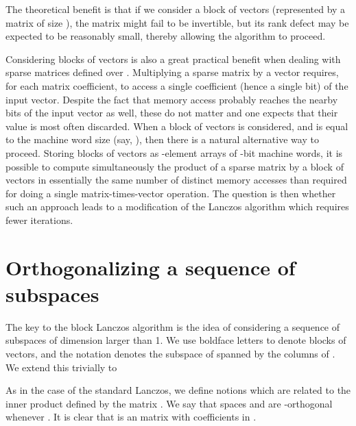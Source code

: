 The theoretical benefit is that if
we consider a block of  vectors  (represented by a
matrix of size ), the matrix  might
fail to be invertible, but its rank defect may be expected to be
reasonably small, thereby allowing the algorithm to proceed.

Considering blocks of vectors is also a great practical benefit when
dealing with sparse matrices defined over . Multiplying a sparse
matrix by a vector requires, for each matrix coefficient, to access a
single coefficient (hence a single bit) of the input vector. Despite the
fact that memory access probably reaches the nearby bits of the input
vector as well, these do not matter and one expects that their value is
most often discarded. When a block of  vectors is considered, and 
is equal to the machine word size (say, ), then there is a
natural alternative way to proceed. Storing blocks of vectors as
-element arrays of -bit machine words, it is possible to compute
simultaneously the product of a sparse matrix by a block of vectors in
essentially the same number of distinct memory accesses than required for
doing a single matrix-times-vector operation. The question is then
whether such an approach leads to a modification of the Lanczos algorithm
which requires fewer iterations.

\section{Orthogonalizing a sequence of subspaces}

The key to the block Lanczos algorithm is the idea of considering a
sequence of subspaces of dimension larger than 1. We use boldface letters
to denote blocks of  vectors, and the notation
 denotes the subspace of  spanned by
the  columns of . We extend this trivially to

As in the case of the standard Lanczos,
we define notions which are related to the inner product defined by the
matrix . We say that spaces  and
 are -orthogonal whenever . It is
clear that  is an  matrix with
coefficients in .

